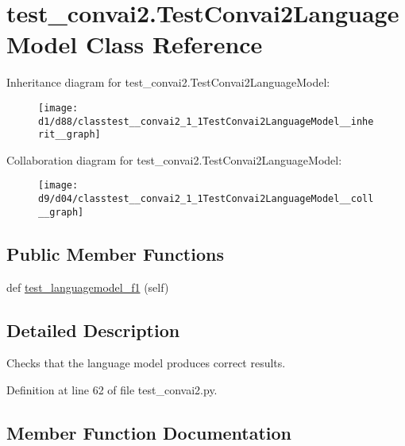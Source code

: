 \hypertarget{classtest__convai2_1_1TestConvai2LanguageModel}{}\section{test\+\_\+convai2.\+Test\+Convai2\+Language\+Model Class Reference}
\label{classtest__convai2_1_1TestConvai2LanguageModel}


Inheritance diagram for test\+\_\+convai2.\+Test\+Convai2\+Language\+Model\+:\nopagebreak
\begin{figure}[H]
\begin{center}
\leavevmode
\texttt{[image: d1/d88/classtest\_\_convai2\_1\_1TestConvai2LanguageModel\_\_inherit\_\_graph]}
\end{center}
\end{figure}


Collaboration diagram for test\+\_\+convai2.\+Test\+Convai2\+Language\+Model\+:\nopagebreak
\begin{figure}[H]
\begin{center}
\leavevmode
\texttt{[image: d9/d04/classtest\_\_convai2\_1\_1TestConvai2LanguageModel\_\_coll\_\_graph]}
\end{center}
\end{figure}
\subsection*{Public Member Functions}
\begin{DoxyCompactItemize}
\item 
def \hyperlink{classtest__convai2_1_1TestConvai2LanguageModel_a854c13ca56bdf47737d0e54a5e012405}{test\+\_\+languagemodel\+\_\+f1} (self)
\end{DoxyCompactItemize}


\subsection{Detailed Description}
\begin{DoxyVerb}Checks that the language model produces correct results.
\end{DoxyVerb}
 

Definition at line 62 of file test\+\_\+convai2.\+py.



\subsection{Member Function Documentation}
\mbox{\label{classtest__convai2_1_1TestConvai2LanguageModel_a854c13ca56bdf47737d0e54a5e012405}} 
